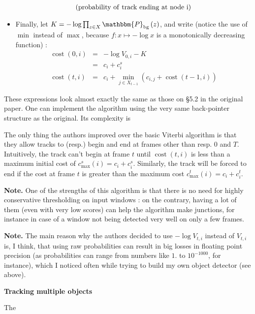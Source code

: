 \documentclass{letter}
\newcommand{\section}[1]{\medskip\bigskip

\noindent\textbf{\LARGE #1}}
\newcommand{\tmop}[1]{\ensuremath{\operatorname{#1}}}
\newcommand{\tmstrong}[1]{\textbf{#1}}
\begin{document}
\begin{itemize}
\begin{eqnarray*}
    \text{(\tmop{probability} \tmop{of} \tmop{track} \tmop{ending} \tmop{at}
    \tmop{node} i)}
  \end{eqnarray*}
  \item Finally, let $K = - \log \prod_{z \in X} \mathbbm{P}_{\tmop{bg}}
  \left( z \right)$, and write (notice the use of $\min$ instead of $\max$,
  because $f : x \mapsto - \log x$ is a monotonically decreasing function) :
  \begin{eqnarray*}
    \tmop{cost} \left( 0, i \right) & = & - \log V_{0, i} - K\\
    & = & c_i + c_i^s\\
    \tmop{cost} \left( t, i \right) & = & c_i + \min_{j \in X_{t - 1}} \left(
    c_{i, j} + \tmop{cost} \left( t - 1, i \right) \right)
  \end{eqnarray*}
\end{itemize}
These expressions look almost exactly the same as those on {\S}5.2 in the
original paper. One can implement the algorithm using the very same
back-pointer structure as the original. Its complexity is

The only thing the authors improved over the basic Viterbi algorithm is that
they allow tracks to (resp.) begin and end at frames other than resp. 0 and
$T$. Intuitively, the track can't begin at frame $t$ until $\tmop{cost} \left(
t, i \right)$ is less than a maximum initial cost of $c_{\max}^s \left( i
\right) = c_i + c_i^s$. Similarly, the track will be forced to end if the cost
at frame $t$ is greater than the maximum cost $c_{\max}^t \left( i \right) =
c_i + c_i^t$.

{\tmstrong{Note.}} One of the strengths of this algorithm is that there is no
need for highly conservative thresholding on input windows : on the contrary,
having a lot of them (even with very low scores) can help the algorithm make
junctions, for instance in case of a window not being detected very well on
only a few frames.

{\tmstrong{Note.}} The main reason why the authors decided to use $- \log
V_{t, i}$ instead of $V_{t, i}$ is, I think, that using raw probabilities can
result in big losses in floating point precision (as probabilities can range
from numbers like {\tmstrong{$1.$}} to {\tmstrong{$10^{- 1000}$}}, for
instance), which I noticed often while trying to build my own object detector
(see above).

\section{Tracking multiple objects}

The
\end{document}
